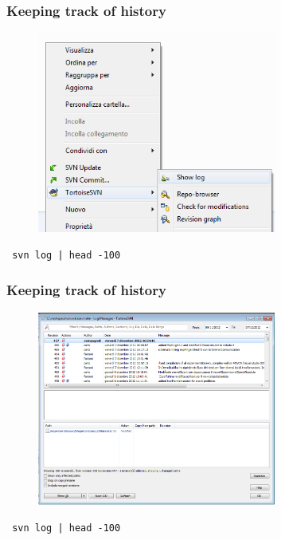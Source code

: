 \documentclass[10pt]{beamer}
\begin{document}
\begin{frame}[fragile]
\frametitle{Keeping track of history}
\begin{figure}[h]
 \centering
 \includegraphics[width=0.7\textwidth]{images/image14.png}
\end{figure}
\begin{verbatim}
 svn log | head -100
\end{verbatim}
\end{frame}

\begin{frame}[fragile]
\frametitle{Keeping track of history}
\begin{figure}[h]
 \centering
 \includegraphics[width=0.7\textwidth]{images/image15.png}
\end{figure}
\begin{verbatim}
 svn log | head -100
\end{verbatim}
\end{frame}
\end{document}
